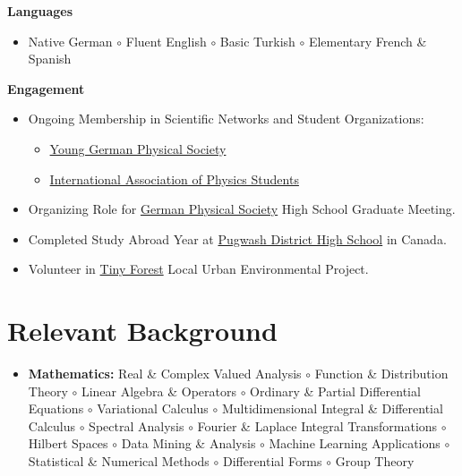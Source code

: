 \documentclass[11pt,a4paper]{article}
\begin{document}
\vspace{7pt}

\noindent \textbf{Languages}
\begin{itemize}[itemsep=-2pt, topsep=0pt, leftmargin=0pt, label={}]
	\item Native German $\circ$ Fluent English $\circ$ Basic Turkish $\circ$ Elementary French \& Spanish
\end{itemize}

\vspace{7pt}

\noindent \textbf{Engagement}
\begin{itemize}[itemsep=-2pt, topsep=2pt, leftmargin=14pt, label={\raisebox{-0.15ex}{\normalsize\textbullet}}]
	\item Ongoing Membership in Scientific Networks and Student Organizations:
	\begin{itemize}[itemsep=0pt, topsep=-2pt, leftmargin=14pt, label={\raisebox{-0.15ex}{\normalsize\circ}}]
		\item \href{https://www.dpg-physik.de/vereinigungen/fachuebergreifend/ak/akjdpg?set_language=en}{Young German Physical Society}
		\item \href{https://iaps.info/}{International Association of Physics Students}
	\end{itemize}
	\item Organizing Role for \href{https://www.dpg-physik.de/?set_language=en}{German Physical Society} High School Graduate Meeting.
	\item Completed Study Abroad Year at \href{https://pdhs.ccrce.ca/}{Pugwash District High School} in Canada.
	\item Volunteer in \href{https://tiny-forest-friends.de/}{Tiny Forest} Local Urban Environmental Project.
\end{itemize}


\section{Relevant Background}
\begin{itemize}[itemsep=-2pt, topsep=0pt, leftmargin=0pt, label={}]
	\item \textbf{Mathematics:} Real \& Complex Valued Analysis $\circ$ Function \& Distribution Theory $\circ$ Linear
	Algebra \& Operators $\circ$ Ordinary \& Partial Differential Equations $\circ$ Variational Calculus $\circ$
	Multidimensional Integral \& Differential Calculus $\circ$ Spectral Analysis $\circ$ Fourier \& Laplace
	Integral Transformations $\circ$ Hilbert Spaces $\circ$ Data Mining \& Analysis $\circ$ Machine Learning
	Applications $\circ$ Statistical \& Numerical Methods $\circ$ Differential Forms $\circ$ Group Theory
\end{itemize}
\end{document}
